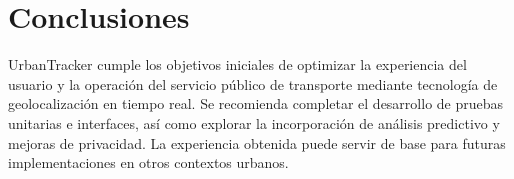 \section{Conclusiones}
UrbanTracker cumple los objetivos iniciales de optimizar la experiencia del usuario y la operación del servicio público de transporte mediante tecnología de geolocalización en tiempo real. Se recomienda completar el desarrollo de pruebas unitarias e interfaces, así como explorar la incorporación de análisis predictivo y mejoras de privacidad. La experiencia obtenida puede servir de base para futuras implementaciones en otros contextos urbanos.